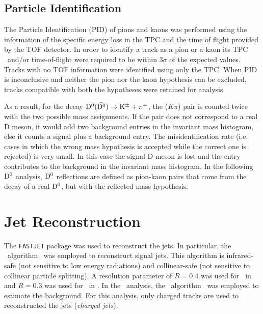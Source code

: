 \subsection{Particle Identification}

The Particle Identification (PID) of pions and kaons was performed using the information of the specific energy loss 
in the TPC and the time of flight provided by the TOF detector. 
In order to identify a track as a pion or a kaon its TPC \dedx\ and/or time-of-flight were required to be within 3$\sigma$ of the expected values. 
Tracks with no TOF information were identified using only the TPC.
When PID is inconclusive and neither the pion nor the kaon hypothesis can be excluded, tracks compatible with both the hypotheses 
were retained for analysis.

As a result, for the decay $\mathrm{D^{0}} (\bar{\mathrm{D^{0}}}) \to {\rm K}^{\pm} + \pi^{\mp}$, the ($K\pi$) pair is counted twice with the two possible mass assignments. If the pair does not correspond
to a real D meson, it would add two background entries in the invariant mass histogram, else it 
counts a signal plus a background entry. 
The misidentification rate (i.e. cases in which the wrong mass
hypothesis is accepted while the correct one is rejected) is very small. In this case the signal D meson
is lost and the entry contributes to the background in the invariant mass histogram. In the following $\mathrm{D^{0}}$ analysis, $\mathrm{D^{0}}$
reflections are defined as pion-kaon pairs that come from the decay of a real $\mathrm{D^{0}}$, but with the reflected mass hypothesis.



\section{Jet Reconstruction}

The \texttt{FASTJET}\cite{Cacciari:2012} package was used to reconstruct the jets. 
In particular, the \antikt\ algorithm~\cite{Cacciari:2008c} was employed to reconstruct signal jets. 
This algorithm is infrared-safe (not sensitive to low energy radiations) and collinear-safe (not sensitive to collinear particle splitting).
A resolution parameter of $R=0.4$ was used for \Dstar\ in \pPb\, and $R=0.3$ was used for \Dzero\ in \pPb.
In the \pPb\ analysis, the \kt\ algorithm~\cite{Cacciari:2006} was employed to estimate the background. 
For this analysis, only charged tracks are used to reconstructed the jets (\emph{charged jets}).

